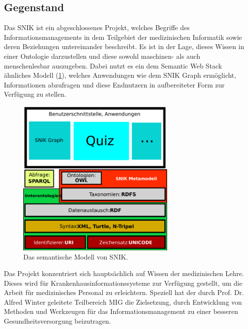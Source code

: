 \documentclass[headsepline,titlepage,ngerman,twoside,12pt]{report}
\begin{document}
\subsection{Gegenstand}
\label{sub:Gegenstand}
Das \ac{SNIK} ist ein abgeschlossenes Projekt, welches Begriffe des Informationsmanagements in dem Teilgebiet der  medizinischen Informatik sowie deren Beziehungen untereinander beschreibt.
Es ist in der Lage, dieses Wissen in einer Ontologie darzustellen und diese sowohl maschinen- als auch menschenlesbar auszugeben.
Dabei nutzt es ein dem Semantic Web Stack ähnliches Modell (\cref{img:semanticwebstack2}), welches Anwendungen wie dem \ac{SNIK} Graph ermöglicht, Informationen abzufragen und diese Endnutzern in aufbereiteter Form zur Verfügung zu stellen.
\begin{figure}
\centering
\includegraphics[width=0.7\textwidth]{images/swebstackde_snik.pdf}
\caption{Das semantische Modell von SNIK.}
\label{img:semanticwebstack2}
\end{figure}
Das Projekt konzentriert sich hauptsächlich auf Wissen der medizinischen Lehre. Dieses wird für Krankenhausinformationssysteme zur Verfügung gestellt, um die Arbeit für medizinisches Personal zu erleichtern. Speziell hat der durch Prof. Dr. Alfred Winter geleitete Teilbereich \ac{MIG} die Zielsetzung, durch Entwicklung von Methoden und Werkzeugen für das Informationsmanagement zu einer besseren Gesundheitsversorgung beizutragen.
\end{document}
